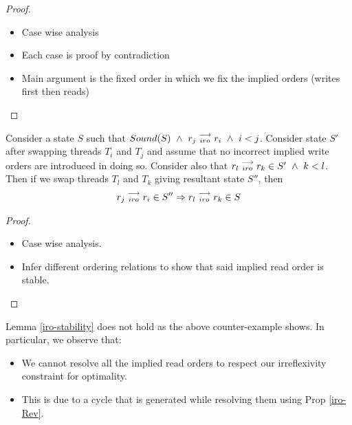         \begin{proof}
            \begin{itemize}
                \item Case wise analysis
                \item Each case is proof by contradiction
                \item Main argument is the fixed order in which we fix the implied orders (writes first then reads)
            \end{itemize}    
        \end{proof}

        \begin{lemma}
            \label{iro-stability}
            Consider a state $S$ such that $Sound(S) \ \wedge \ \reln{r_j}{iro}{r_i} \ \wedge \ i < j$.
            Consider state $S'$ after swapping threads $T_i$ and $T_j$ and assume that no incorrect implied write orders are introduced in doing so. 
            Consider also that $r_l\stackrel{\longrightarrow}{_{iro}}r_k \in S' \ \wedge \ k < l$.
            Then if we swap threads $T_l$ and $T_k$ giving resultant state $S''$, then 
            \begin{align*}
                r_j\stackrel{\longrightarrow}{_{iro}}r_i \in S'' 
                \Rightarrow
                r_l\stackrel{\longrightarrow}{_{iro}}r_k \in S
            \end{align*} 
        \end{lemma}

        \begin{proof}


            \begin{itemize}
                \item Case wise analysis.
                \item Infer different ordering relations to show that said implied read order is stable.
            \end{itemize}

        \end{proof}

        Lemma \ref{iro-stability} does not hold as the above counter-example shows.
        In particular, we observe that:
        \begin{itemize}
            \item We cannot resolve all the implied read orders to respect our irreflexivity constraint for optimality.
            \item This is due to a cycle that is generated while resolving them using Prop \ref{iro-Rev}.
        \end{itemize}

